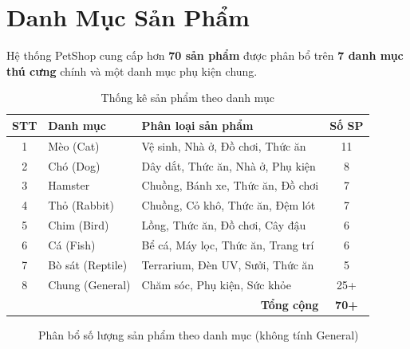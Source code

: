 \documentclass[12pt, a4paper]{report}
\begin{document}
\chapter{Danh Mục Sản Phẩm}

Hệ thống PetShop cung cấp hơn \textbf{70 sản phẩm} được phân bổ trên \textbf{7 danh mục thú cưng} chính và một danh mục phụ kiện chung.

\begin{table}[H]
    \centering
    \caption{Thống kê sản phẩm theo danh mục}
    \begin{tabular}{clp{6cm}c}
        \toprule
        \textbf{STT} & \textbf{Danh mục} & \textbf{Phân loại sản phẩm} & \textbf{Số SP} \\
        \midrule
        1 & Mèo (Cat)        & Vệ sinh, Nhà ở, Đồ chơi, Thức ăn         & 11 \\
        2 & Chó (Dog)        & Dây dắt, Thức ăn, Nhà ở, Phụ kiện        & 8  \\
        3 & Hamster          & Chuồng, Bánh xe, Thức ăn, Đồ chơi        & 7  \\
        4 & Thỏ (Rabbit)     & Chuồng, Cỏ khô, Thức ăn, Đệm lót         & 7  \\
        5 & Chim (Bird)      & Lồng, Thức ăn, Đồ chơi, Cây đậu          & 6  \\
        6 & Cá (Fish)        & Bể cá, Máy lọc, Thức ăn, Trang trí       & 6  \\
        7 & Bò sát (Reptile) & Terrarium, Đèn UV, Sưởi, Thức ăn         & 5  \\
        8 & Chung (General)  & Chăm sóc, Phụ kiện, Sức khỏe             & 25+ \\
        \midrule
        \multicolumn{3}{r}{\textbf{Tổng cộng}} & \textbf{70+} \\
        \bottomrule
    \end{tabular}
\end{table}

\begin{figure}[H]
    \centering
    \caption{Phân bổ số lượng sản phẩm theo danh mục (không tính General)}
\end{figure}
\end{document}
